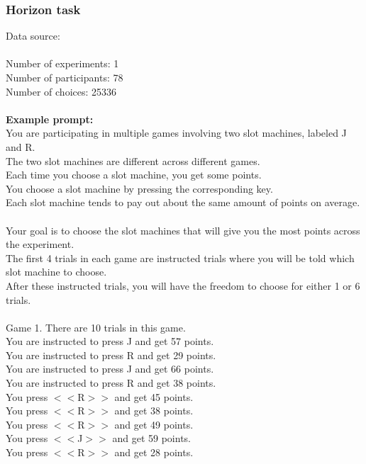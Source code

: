 \documentclass[pdflatex,sn-nature]{sn-jnl}%
\theoremstyle{thmstyleone}%
\theoremstyle{thmstyletwo}%
\theoremstyle{thmstylethree}%
\begin{document}
\subsubsection*{Horizon task}
Data source: \cite{sadeghiyeh2020temporal} \\ $~$ \\
Number of experiments: 1 $~$\\ 
Number of participants: 78 $~$\\ 
Number of choices: 25336 $~$\\ 
 $~$\\ 
\textbf{Example prompt:}
 $~$\\ 
You are participating in multiple games involving two slot machines, labeled J and R. $~$\\ 
The two slot machines are different across different games. $~$\\ 
Each time you choose a slot machine, you get some points. $~$\\ 
You choose a slot machine by pressing the corresponding key. $~$\\ 
Each slot machine tends to pay out about the same amount of points on average. $~$\\ 
Your goal is to choose the slot machines that will give you the most points across the experiment. $~$\\ 
The first 4 trials in each game are instructed trials where you will be told which slot machine to choose. $~$\\ 
After these instructed trials, you will have the freedom to choose for either 1 or 6 trials. $~$\\ 
 $~$\\ 
Game 1. There are 10 trials in this game. $~$\\ 
You are instructed to press J and get 57 points. $~$\\ 
You are instructed to press R and get 29 points. $~$\\ 
You are instructed to press J and get 66 points. $~$\\ 
You are instructed to press R and get 38 points. $~$\\ 
You press $<<$R$>>$ and get 45 points. $~$\\ 
You press $<<$R$>>$ and get 38 points. $~$\\ 
You press $<<$R$>>$ and get 49 points. $~$\\ 
You press $<<$J$>>$ and get 59 points. $~$\\ 
You press $<<$R$>>$ and get 28 points. $~$\\ 
\end{document}
